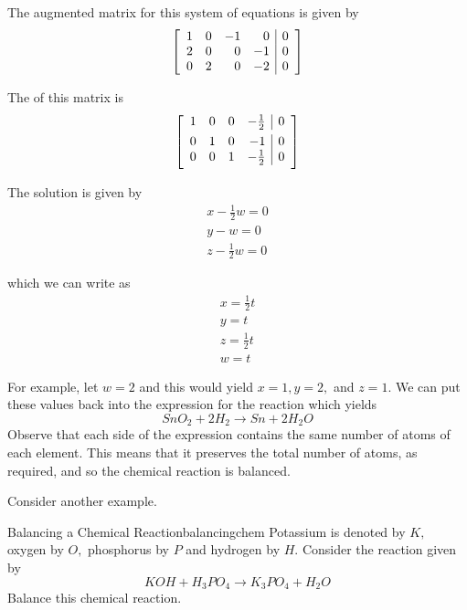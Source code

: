 The augmented matrix for this system of equations is given by 
\begin{equation*}
\left[ 
\begin{array}{rrrr|r}
1 & 0 & -1 & 0 & 0 \\ 
2 & 0 & 0 & -1 & 0 \\ 
0 & 2 & 0 & -2 & 0
\end{array}
\right]
\end{equation*}

The \rref \;of this matrix is 
\begin{equation*}
\leftB
\begin{array}{rrrr|r}
1 & 0 & 0 & -\vspace{0.05in}\frac{1}{2} & 0 \\ 
0 & 1 & 0 & -1 & 0 \\ 
0 & 0 & 1 & -\vspace{0.05in}\frac{1}{2} & 0
\end{array}
\rightB
\end{equation*}

The solution is given by 
\begin{equation*}
\begin{array}{c}
x - \frac{1}{2} w = 0 \\
y - w = 0 \\
z - \frac{1}{2}w = 0
\end{array}
\end{equation*} 

which we can write as 
\begin{equation*}
\begin{array}{c}
x = \frac{1}{2} t \\
y = t \\
z = \frac{1}{2}t \\
w = t
\end{array}
\end{equation*}

For example, let $w=2$ and this would yield $x=1,y=2,$ and $z=1.$ We can put these values back into 
the expression for the reaction which yields 
\begin{equation*}
SnO_{2}+2H_{2}\rightarrow Sn+2H_{2}O
\end{equation*}
Observe that each side of the expression contains the same number of atoms of each element. This means that 
it preserves the total number of atoms, as required, and so the chemical
reaction is balanced. 

Consider another example.

\begin{example}{Balancing a Chemical Reaction}{balancingchem}
Potassium is denoted by $K,$ oxygen by $O,$
phosphorus by $P$ and hydrogen by $H$. 
Consider the reaction given by
\begin{equation*}
KOH+H_{3}PO_{4}\rightarrow K_{3}PO_{4}+H_{2}O
\end{equation*}
Balance this chemical reaction.
\end{example}

